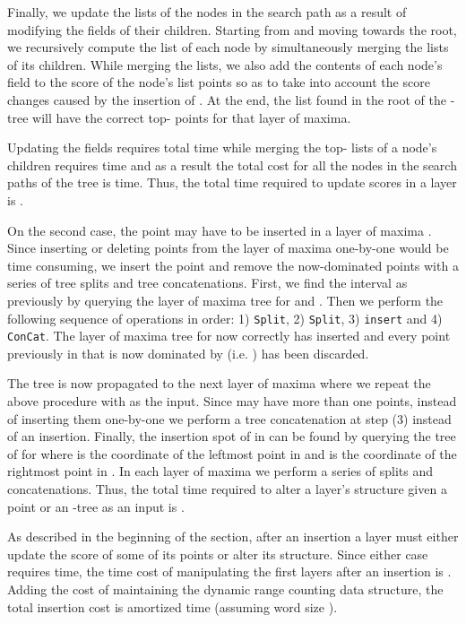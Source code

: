 \documentclass{llncs}
\begin{document}
Finally, we update the  lists of the nodes in the search path as a result of modifying the  fields of their children. Starting from  and moving towards the root, we recursively compute the  list of each node  by simultaneously merging the  lists of its children. While merging the lists, we also add the contents of each node's  field to the score of the node's  list points so as to take into account the score changes caused by the insertion of . At the end, the  list found in the root of the -tree will have the correct top- points for that layer of maxima.

Updating the  fields requires  total time while merging the top- lists of a node's children requires  time and as a result the total cost for all the nodes in the search paths of the tree is  time. Thus, the total time required to update scores in a layer is .

On the second case, the point  may have to be inserted in a layer of maxima . Since inserting or deleting points from the layer of maxima one-by-one would be time consuming, we insert the point and remove the now-dominated points with a series of tree splits and tree concatenations. First, we find the interval as previously by querying the layer of maxima tree  for  and . Then we perform the following sequence of operations in order: 1) \texttt{Split}, 2) \texttt{Split}, 3) \texttt{insert} and 4) \texttt{ConCat}.
The layer of maxima tree  for  now correctly has  inserted and every point previously in  that is now dominated by  (i.e. ) has been discarded.

The tree  is now propagated to the next layer of maxima  where we repeat the above procedure with  as the input. Since  may have more than one points, instead of inserting them one-by-one we perform a tree concatenation at step (3) instead of an insertion. Finally, the insertion spot of  in  can be found by querying the tree of  for  where  is the  coordinate of the leftmost point in  and  is the  coordinate of the rightmost point in . In each layer of maxima we perform a series of  splits and concatenations. Thus, the total time required to alter a layer's structure given a point or an -tree as an input is .

As described in the beginning of the section, after an insertion a layer must either update the score of some of its points or alter its structure. Since either case requires  time, the time cost of manipulating the  first layers after an insertion is . Adding the cost of maintaining the dynamic range counting data structure, the total insertion cost is  amortized time (assuming word size ).
\end{document}
